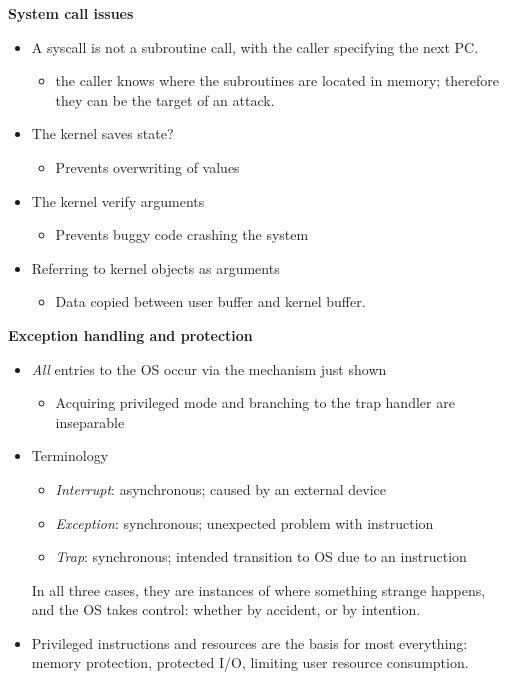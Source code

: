 \documentclass[11pt,a4paper]{article}
\begin{document}
\textbf{System call issues}
\begin{itemize}
    \item A syscall is not a subroutine call, with the caller specifying the next PC.\
        \begin{itemize}
            \item the caller knows where the subroutines are located in memory;
                therefore they can be the target of an attack.
        \end{itemize}
    \item The kernel saves state?
        \begin{itemize}
            \item Prevents overwriting of values
        \end{itemize}
    \item The kernel verify arguments
        \begin{itemize}
            \item Prevents buggy code crashing the system
        \end{itemize}
    \item Referring to kernel objects as arguments
        \begin{itemize}
            \item Data copied between user buffer and kernel buffer.
        \end{itemize}
\end{itemize}

\textbf{Exception handling and protection}
\begin{itemize}
    \item \emph{All} entries to the OS occur via the mechanism just shown
        \begin{itemize}
            \item Acquiring privileged mode and branching to the trap handler are inseparable
        \end{itemize}
    \item Terminology
        \begin{itemize}
            \item \emph{Interrupt}: asynchronous; caused by an external device
            \item \emph{Exception}: synchronous; unexpected problem with instruction
            \item \emph{Trap}: synchronous; intended transition to OS due to an instruction
        \end{itemize}
        In all three cases, they are instances of where something strange happens,
        and the OS takes control: whether by accident, or by intention.
    \item Privileged instructions and resources are the basis for most everything:
        memory protection, protected I/O, limiting user resource consumption.
\end{itemize}
\end{document}
